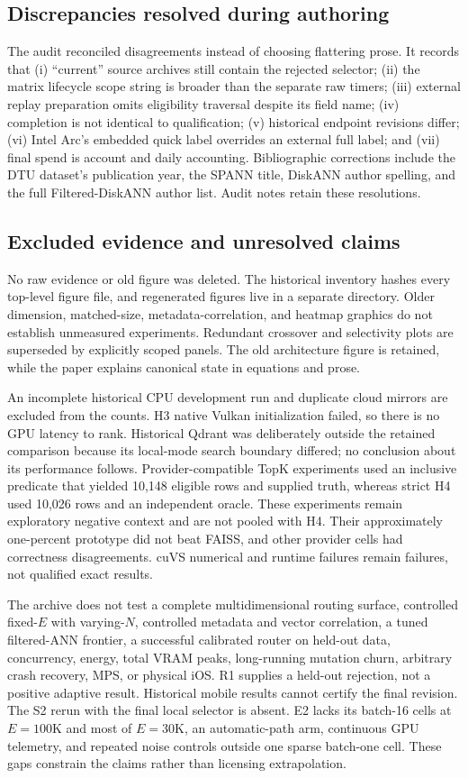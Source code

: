 \subsection{Discrepancies resolved during authoring}
The audit reconciled disagreements instead of choosing flattering prose. It records that (i) ``current'' source archives still contain the rejected selector; (ii) the matrix lifecycle scope string is broader than the separate raw timers; (iii) external replay preparation omits eligibility traversal despite its field name; (iv) completion is not identical to qualification; (v) historical endpoint revisions differ; (vi) Intel Arc's embedded quick label overrides an external full label; and (vii) final spend is account and daily accounting. Bibliographic corrections include the DTU dataset's publication year, the SPANN title, DiskANN author spelling, and the full Filtered-DiskANN author list. Audit notes retain these resolutions.

\subsection{Excluded evidence and unresolved claims}
No raw evidence or old figure was deleted. The historical inventory hashes every top-level figure file, and regenerated figures live in a separate  directory. Older dimension, matched-size, metadata-correlation, and heatmap graphics do not establish unmeasured experiments. Redundant crossover and selectivity plots are superseded by explicitly scoped panels. The old architecture figure is retained, while the paper explains canonical state in equations and prose.

An incomplete historical CPU development run and duplicate cloud mirrors are excluded from the counts. H3 native Vulkan initialization failed, so there is no GPU latency to rank. Historical Qdrant was deliberately outside the retained comparison because its local-mode search boundary differed; no conclusion about its performance follows. Provider-compatible TopK experiments used an inclusive predicate that yielded 10,148 eligible rows and supplied truth, whereas strict H4 used 10,026 rows and an independent oracle. These experiments remain exploratory negative context and are not pooled with H4. Their approximately one-percent prototype did not beat FAISS, and other provider cells had correctness disagreements. cuVS numerical and runtime failures remain failures, not qualified exact results.

The archive does not test a complete multidimensional routing surface, controlled fixed-$E$ with varying-$N$, controlled metadata and vector correlation, a tuned filtered-ANN frontier, a successful calibrated router on held-out data, concurrency, energy, total VRAM peaks, long-running mutation churn, arbitrary crash recovery, MPS, or physical iOS. R1 supplies a held-out rejection, not a positive adaptive result. Historical mobile results cannot certify the final revision. The S2 rerun with the final local selector is absent. E2 lacks its batch-16 cells at $E=100$K and most of $E=30$K, an automatic-path arm, continuous GPU telemetry, and repeated noise controls outside one sparse batch-one cell. These gaps constrain the claims rather than licensing extrapolation.

